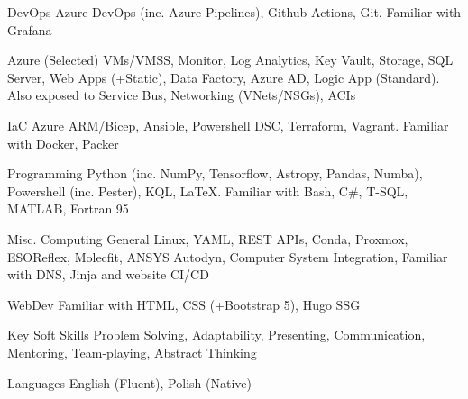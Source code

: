 

\begin{cvskills}

  \cvskill
    {DevOps} 
    {Azure DevOps (inc. Azure Pipelines), Github Actions, Git. Familiar with Grafana} 

  \cvskill
    {Azure (Selected)} 
    {VMs/VMSS, Monitor, Log Analytics, Key Vault, Storage, SQL Server, Web Apps (+Static), Data Factory, Azure AD, Logic App (Standard). Also exposed to Service Bus, Networking (VNets/NSGs), ACIs}

  \cvskill
    {IaC} 
    {Azure ARM/Bicep, Ansible, Powershell DSC, Terraform, Vagrant. Familiar with Docker, Packer} 

  \cvskill
    {Programming} 
    {Python (inc. NumPy, Tensorflow, Astropy, Pandas, Numba), Powershell (inc. Pester), KQL, \LaTeX. Familiar with Bash, C\#, T-SQL, MATLAB, Fortran 95} 
    
  \cvskill
    {Misc. Computing} 
    {General Linux, YAML, REST APIs, Conda, Proxmox, ESOReflex, Molecfit, ANSYS Autodyn, Computer System Integration, Familiar with DNS, Jinja and website CI/CD} 

  \cvskill
    {WebDev} 
    {Familiar with HTML, CSS (+Bootstrap 5), Hugo SSG} 

  \cvskill
    {Key Soft Skills} 
    {Problem Solving, Adaptability, Presenting, Communication, Mentoring, Team-playing, Abstract Thinking} 

  \cvskill
    {Languages} 
    {English (Fluent), Polish (Native)} 
    
\end{cvskills}
